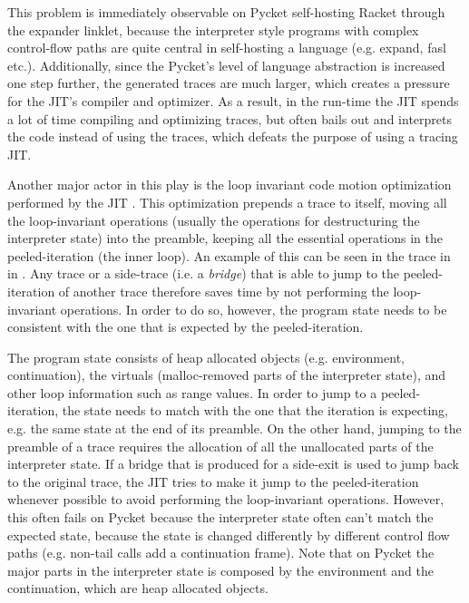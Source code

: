 This problem is immediately observable on Pycket self-hosting Racket
through the expander linklet, because the interpreter style programs
with complex control-flow paths are quite central in self-hosting a
language (e.g. expand, fasl etc.). Additionally, since the Pycket's
level of language abstraction is increased one step further, the
generated traces are much larger, which creates a pressure for the
JIT's compiler and optimizer. As a result, in the run-time the JIT
spends a lot of time compiling and optimizing traces, but often bails
out and interprets the code instead of using the traces, which defeats
the purpose of using a tracing JIT.


Another major actor in this play is the loop invariant code motion
optimization performed by the JIT \cite{loop-aware:12}. This
optimization prepends a trace to itself, moving all the loop-invariant
operations (usually the operations for destructuring the interpreter
state) into the preamble, keeping all the essential operations in the
peeled-iteration (the inner loop). An example of this can be seen in
the trace in  in . Any trace
or a side-trace (i.e. a \emph{bridge}) that is able to jump to the
peeled-iteration of another trace therefore saves time by not
performing the loop-invariant operations. In order to do so, however,
the program state needs to be consistent with the one that is expected
by the peeled-iteration.

The program state consists of heap allocated objects
(e.g. environment, continuation), the virtuals (malloc-removed parts
of the interpreter state), and other loop information such as range
values. In order to jump to a peeled-iteration, the state needs to
match with the one that the iteration is expecting, e.g. the same
state at the end of its preamble. On the other hand, jumping to the
preamble of a trace requires the allocation of all the unallocated
parts of the interpreter state. If a bridge that is produced for a
side-exit is used to jump back to the original trace, the JIT tries to
make it jump to the peeled-iteration whenever possible to avoid
performing the loop-invariant operations. However, this often fails on
Pycket because the interpreter state often can't match the expected
state, because the state is changed differently by different control
flow paths (e.g. non-tail calls add a continuation frame). Note that
on Pycket the major parts in the interpreter state is composed by the
environment and the continuation, which are heap allocated objects.

